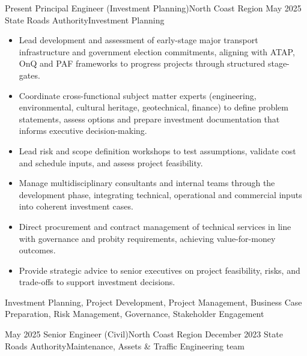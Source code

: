 %
%
%



\begin{experiences}

\consultantexperience
  {Present} {Principal Engineer (Investment Planning)}{}{North Coast Region}
  {May 2025} {State Roads Authority}{Investment Planning}
  {
    \begin{itemize}
\item Lead development and assessment of early-stage major transport infrastructure and government election commitments, aligning with ATAP, OnQ and PAF frameworks to progress projects through structured stage-gates.
\item Coordinate cross-functional subject matter experts (engineering, environmental, cultural heritage, geotechnical, finance) to define problem statements, assess options and prepare investment documentation that informs executive decision-making.
\item Lead risk and scope definition workshops to test assumptions, validate cost and schedule inputs, and assess project feasibility.
\item Manage multidisciplinary consultants and internal teams through the development phase, integrating technical, operational and commercial inputs into coherent investment cases.
\item Direct procurement and contract management of technical services in line with governance and probity requirements, achieving value-for-money outcomes.
\item Provide strategic advice to senior executives on project feasibility, risks, and trade-offs to support investment decisions.
    \end{itemize}
  }
  {Investment Planning, Project Development, Project Management, Business Case Preparation, Risk Management, Governance, Stakeholder Engagement}
\emptySeparator

\consultantexperience
  {May 2025}    {Senior Engineer (Civil)}{}{North Coast Region}
  {December 2023}   {State Roads Authority}{Maintenance, Assets \& Traffic Engineering team}
  {                 
  
}
\end{experiences}
